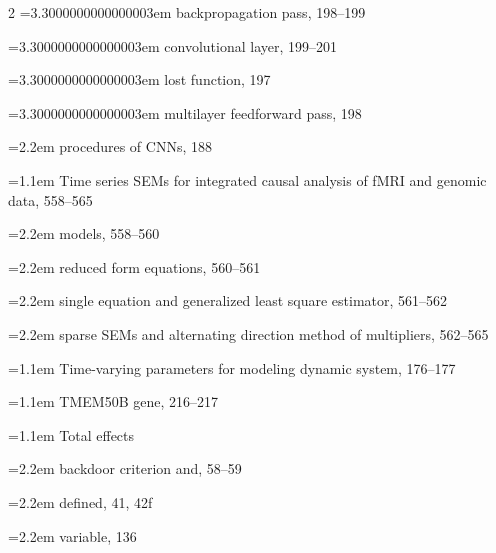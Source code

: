 \begin{multicols}{2}
\noindent\hangindent=3.3000000000000003em \hspace*{2.2em}backpropagation pass, 198--199\par
\noindent\hangindent=3.3000000000000003em \hspace*{2.2em}convolutional layer, 199--201\par
\noindent\hangindent=3.3000000000000003em \hspace*{2.2em}lost function, 197\par
\noindent\hangindent=3.3000000000000003em \hspace*{2.2em}multilayer feedforward pass, 198\par
\noindent\hangindent=2.2em \hspace*{1.1em}procedures of CNNs, 188\par
\noindent\hangindent=1.1em Time series SEMs for integrated causal analysis of fMRI and genomic data, 558--565\par
\noindent\hangindent=2.2em \hspace*{1.1em}models, 558--560\par
\noindent\hangindent=2.2em \hspace*{1.1em}reduced form equations, 560--561\par
\noindent\hangindent=2.2em \hspace*{1.1em}single equation and generalized least square estimator, 561--562\par
\noindent\hangindent=2.2em \hspace*{1.1em}sparse SEMs and alternating direction method of multipliers, 562--565\par
\noindent\hangindent=1.1em Time-varying parameters for modeling dynamic system, 176--177\par
\noindent\hangindent=1.1em TMEM50B gene, 216--217\par
\noindent\hangindent=1.1em Total effects\par
\noindent\hangindent=2.2em \hspace*{1.1em}backdoor criterion and, 58--59\par
\noindent\hangindent=2.2em \hspace*{1.1em}defined, 41, 42f\par
\noindent\hangindent=2.2em \hspace*{1.1em}variable, 136\par

\end{multicols}
